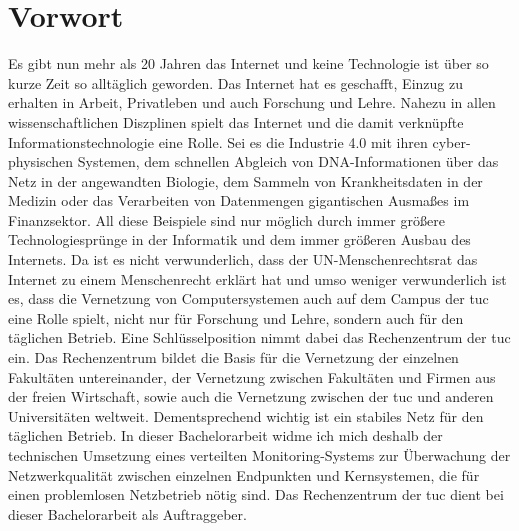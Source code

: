 \documentclass[titlepage]{report}
\begin{document}
\chapter*{Vorwort}
Es gibt nun mehr als 20 Jahren das Internet und keine Technologie
ist über so kurze Zeit so alltäglich geworden. Das Internet hat es
geschafft, Einzug zu erhalten in Arbeit, Privatleben und auch Forschung
und Lehre. Nahezu in allen wissenschaftlichen Diszplinen spielt das
Internet und die damit verknüpfte Informationstechnologie eine Rolle.
Sei es die Industrie 4.0 mit ihren cyber-physischen Systemen, dem
schnellen Abgleich von DNA-Informationen über das Netz in der
angewandten Biologie, dem Sammeln von Krankheitsdaten in der Medizin
oder das Verarbeiten von Datenmengen gigantischen Ausmaßes im
Finanzsektor. All diese Beispiele sind nur möglich durch immer größere
Technologiesprünge in der Informatik und dem immer größeren Ausbau des
Internets. Da ist es nicht verwunderlich, dass der UN-Menschenrechtsrat das
Internet zu einem Menschenrecht\cite{UNHRC} erklärt hat und umso weniger
verwunderlich ist es, dass die Vernetzung von Computersystemen auch auf
dem Campus der \gls{tuc} eine Rolle spielt,
nicht nur für Forschung und Lehre, sondern auch für den
täglichen Betrieb. Eine Schlüsselposition nimmt dabei das Rechenzentrum
der \gls{tuc} ein. Das Rechenzentrum bildet die
Basis für die Vernetzung der einzelnen Fakultäten untereinander, der
Vernetzung zwischen Fakultäten und Firmen aus der freien Wirtschaft,
sowie auch die Vernetzung zwischen der \gls{tuc}
und anderen Universitäten weltweit. Dementsprechend wichtig ist ein
stabiles Netz für den täglichen Betrieb. In dieser Bachelorarbeit widme
ich mich deshalb der technischen Umsetzung eines verteilten
Monitoring-Systems zur Überwachung der Netzwerkqualität zwischen
einzelnen Endpunkten und Kernsystemen, die für einen problemlosen
Netzbetrieb nötig sind. Das Rechenzentrum der \gls{tuc} dient bei dieser
Bachelorarbeit als Auftraggeber.
\end{document}
